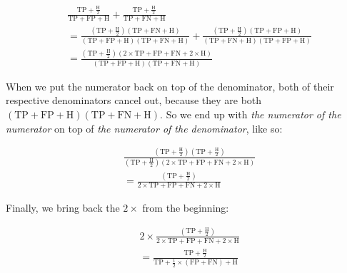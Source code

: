 \documentclass[a4paper,10pt]{article} %
\begin{document}
\begin{align*}
    &\frac{\text{TP}+\frac{\text{H}}{2}}
    {\text{TP}+\text{FP}+\text{H}}
    +
    \frac{\text{TP}+\frac{\text{H}}{2}}
    {\text{TP}+\text{FN}+\text{H}}\\[1.5ex]
    &=
    \frac{\left(
        \text{TP}+\frac{\text{H}}{2}
    \right)\left(
        \text{TP}+\text{FN}+\text{H}
    \right)}
    {\left(
        \text{TP}+\text{FP}+\text{H}
    \right)\left(
        \text{TP}+\text{FN}+\text{H}
    \right)}
    +
    \frac{\left(
        \text{TP}+\frac{\text{H}}{2}
    \right)\left(
        \text{TP}+\text{FP}+\text{H}
    \right)}
    {\left(
        \text{TP}+\text{FN}+\text{H}
    \right)\left(
        \text{TP}+\text{FP}+\text{H}
    \right)}\\[1.5ex]
    &=\frac{\left(
        \text{TP}+\frac{\text{H}}{2}
    \right)\left(
        2\times\text{TP} + \text{FP} + \text{FN} + 2\times\text{H}
    \right)}
    {\left(
        \text{TP}+\text{FP}+\text{H}
    \right)\left(
        \text{TP}+\text{FN}+\text{H}
    \right)}
\end{align*}

\noindent When we put the numerator back on top of the denominator, both of their respective denominators cancel out, because they are both $(\text{TP}+\text{FP}+\text{H})(\text{TP}+\text{FN}+\text{H})$.
So we end up with \emph{the numerator of the numerator} on top of \emph{the numerator of the denominator}, like so:

\begin{align*}
    &\frac{\left(
        \text{TP}+\frac{\text{H}}{2}
    \right)\left(
        \text{TP}+\frac{\text{H}}{2}
    \right)}
    {\left(
        \text{TP}+\frac{\text{H}}{2}
    \right)\left(
        2\times\text{TP} + \text{FP} + \text{FN} + 2\times\text{H}
    \right)}\\[1.5ex]
    &=
    \frac{\left(
        \text{TP}+\frac{\text{H}}{2}
    \right)}
    {2\times\text{TP} + \text{FP} + \text{FN} + 2\times\text{H}}
\end{align*}

\noindent Finally, we bring back the $2\times$ from the beginning:

\begin{align*}
    &2\times\frac{\left(
        \text{TP}+\frac{\text{H}}{2}
    \right)}
    {2\times\text{TP} + \text{FP} + \text{FN} + 2\times\text{H}}\\[1ex]
    &=
    \frac{\text{TP}+\frac{\text{H}}{2}}
    {\text{TP} + \frac{1}{2}\times(\text{FP} + \text{FN}) + \text{H}}
\end{align*}
\end{document}
